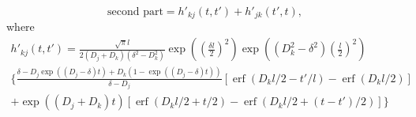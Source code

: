 \documentclass[a4paper]{article}
\newcommand{\erf}{\operatorname{erf}}
\begin{document}
\begin{equation}
  \text{second part} = h'_{kj}(t, t') + h'_{jk}(t', t),
\end{equation}
where
\begin{multline}
  h'_{kj}(t, t') = 
  \frac{\sqrt{\pi}l}{2 (D_j + D_k)(\delta^2 - D_k^2)}\exp\left(\left(\frac{\delta l}{2}\right)^2\right)
  \exp\left((D_k^2 - \delta^2) \left(\frac{l}{2}\right)^2\right) \\
  \bigg\{
  \frac{\delta - D_j \exp((D_j - \delta) t) + D_k (1 - \exp((D_j - \delta)t))}
  {\delta - D_j} [\erf(D_k l/2 - t'/l) - \erf(D_k l/2)]
  \\
  + \exp((D_j + D_k) t)
  [\erf(D_k l/2 + t/2) - \erf(D_k l/2 + (t-t')/2)]
  \bigg\}
\end{multline}
\end{document}
